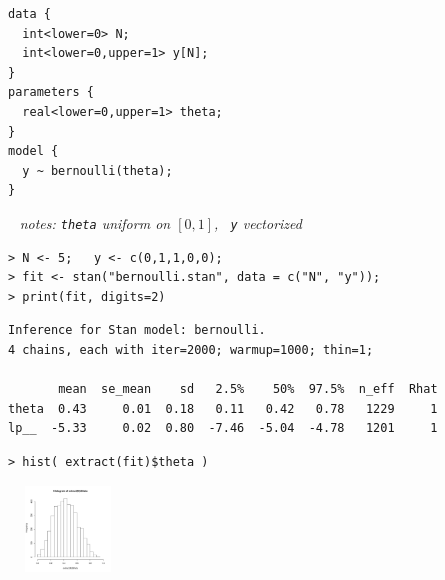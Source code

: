 \documentclass[10pt]{report}
\newcommand{\sld}[1]{\newpage{\noindent\LARGE \ \ \
    \textcolor{MidnightBlue}{\bfseries #1}}\vspace*{4pt}}
\newcommand{\spc}{\hspace*{0.25in}}
\begin{document}
\sld{Example: \ Bernoulli}
\vfill
\spc\spc
\begin{minipage}[t]{0.8\textwidth}
\begin{Verbatim}
data {
  int<lower=0> N;
  int<lower=0,upper=1> y[N];
}
parameters {
  real<lower=0,upper=1> theta;
} 
model {
  y ~ bernoulli(theta);
}
\end{Verbatim}
\end{minipage}
\vfill
\vfill
\vfill
\mbox{ } \hfill {\small\slshape notes: {\tt theta} uniform on $[0,1]$, \ {\tt y} vectorized}
\vfill


\sld{RStan Execution}

\begin{minipage}[t]{\textwidth}
\footnotesize
\begin{Verbatim}
> N <- 5;   y <- c(0,1,1,0,0);
> fit <- stan("bernoulli.stan", data = c("N", "y"));
> print(fit, digits=2)
\end{Verbatim}
\vspace*{1pt}
\begin{Verbatim}[fontshape=sl]
Inference for Stan model: bernoulli.
4 chains, each with iter=2000; warmup=1000; thin=1; 

       mean  se_mean    sd   2.5%    50%  97.5%  n_eff  Rhat
theta  0.43     0.01  0.18   0.11   0.42   0.78   1229     1
lp__  -5.33     0.02  0.80  -7.46  -5.04  -4.78   1201     1
\end{Verbatim}
\vspace*{6pt}
\begin{Verbatim}
> hist( extract(fit)$theta )
\end{Verbatim}
\vspace*{-24pt}
\hfill\includegraphics[width=1.25in,height=0.9in]{img/bernoulli-posterior-histo.pdf}
\hspace*{24pt}
\end{minipage}

\sld{Basic Program Blocks}
\end{document}
